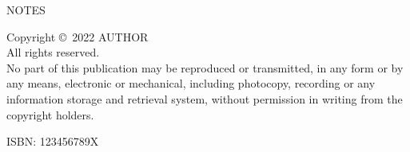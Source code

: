 \renewcommand{\thepage}{\roman{page}}
\mbox{}\par
{\normalsize
  NOTES\\
}
\vspace*{\fill}
\mbox{}\par
{\small
Copyright \copyright\ 2022 AUTHOR\\
All rights reserved.\\
No part of this publication may be reproduced or transmitted, in any
form or by any means, electronic or mechanical, including photocopy,
recording or any information storage and retrieval system, without
permission in writing from the copyright holders.\\[0.5ex]
\begin{center}
ISBN: 123456789X\\
\end{center}

}
\vspace*{1cm}
\cleartorecto
\pagestyle{headings}

\cleartorecto
\mainmatter


